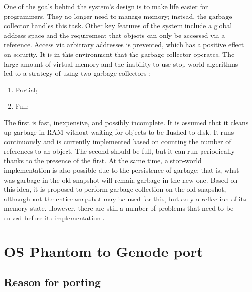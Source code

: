 One of the goals behind the system’s design is to make life easier for programmers. They no longer need to manage memory; instead, the garbage collector handles this task. Other key features of the system include a global address space and the requirement that objects can only be accessed via a reference. Access via arbitrary addresses is prevented, which has a positive effect on security. It is in this environment that the garbage collector operates. The large amount of virtual memory and the inability to use stop-world algorithms led to a strategy of using two garbage collectors \cite{Habr_GC1}:
\begin{enumerate}
    \item Partial;
    \item Full;
\end{enumerate}
The first is fast, inexpensive, and possibly incomplete. It is assumed that it cleans up garbage in RAM without waiting for objects to be flushed to disk. It runs continuously and is currently implemented based on counting the number of references to an object. The second should be full, but it can run periodically thanks to the presence of the first. At the same time, a stop-world implementation is also possible due to the persistence of garbage: that is, what was garbage in the old snapshot will remain garbage in the new one. Based on this idea, it is proposed to perform garbage collection on the old snapshot, although not the entire snapshot may be used for this, but only a reflection of its memory state. However, there are still a number of problems that need to be solved before its implementation \cite{Habr_GC2}.

\section{OS Phantom to Genode port}

\subsection{Reason for porting}

